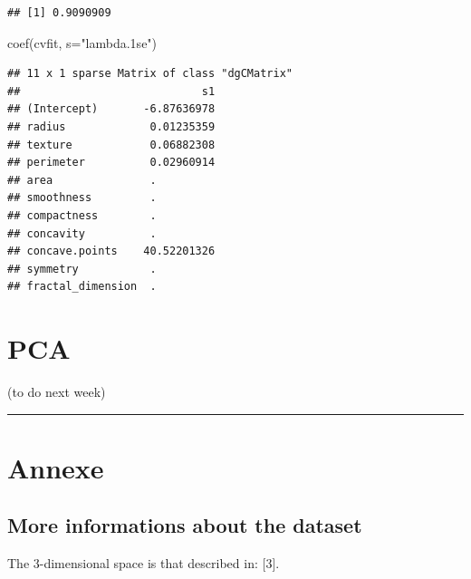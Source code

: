 \documentclass[
  11pt,
]{article}
\newenvironment{Shaded}{\begin{snugshade}}{\end{snugshade}}
\newcommand{\AttributeTok}[1]{\textcolor[rgb]{0.77,0.63,0.00}{#1}}
\newcommand{\DecValTok}[1]{\textcolor[rgb]{0.00,0.00,0.81}{#1}}
\newcommand{\FunctionTok}[1]{\textcolor[rgb]{0.00,0.00,0.00}{#1}}
\newcommand{\NormalTok}[1]{#1}
\newcommand{\SpecialCharTok}[1]{\textcolor[rgb]{0.00,0.00,0.00}{#1}}
\newcommand{\StringTok}[1]{\textcolor[rgb]{0.31,0.60,0.02}{#1}}
\begin{document}
\begin{Shaded}
\end{Shaded}

\begin{verbatim}
## [1] 0.9090909
\end{verbatim}

\begin{Shaded}
\begin{Highlighting}[]
\FunctionTok{coef}\NormalTok{(cvfit, }\AttributeTok{s=}\StringTok{"lambda.1se"}\NormalTok{)}
\end{Highlighting}
\end{Shaded}

\begin{verbatim}
## 11 x 1 sparse Matrix of class "dgCMatrix"
##                            s1
## (Intercept)       -6.87636978
## radius             0.01235359
## texture            0.06882308
## perimeter          0.02960914
## area               .         
## smoothness         .         
## compactness        .         
## concavity          .         
## concave.points    40.52201326
## symmetry           .         
## fractal_dimension  .
\end{verbatim}

\hypertarget{pca}{%
\section{PCA}\label{pca}}

(to do next week)

\begin{center}\rule{0.5\linewidth}{0.5pt}\end{center}

\hypertarget{annexe}{%
\section{Annexe}\label{annexe}}

\hypertarget{more-informations-about-the-dataset}{%
\subsection{More informations about the
dataset}\label{more-informations-about-the-dataset}}

The 3-dimensional space is that described in: {[}3{]}.
\end{document}
